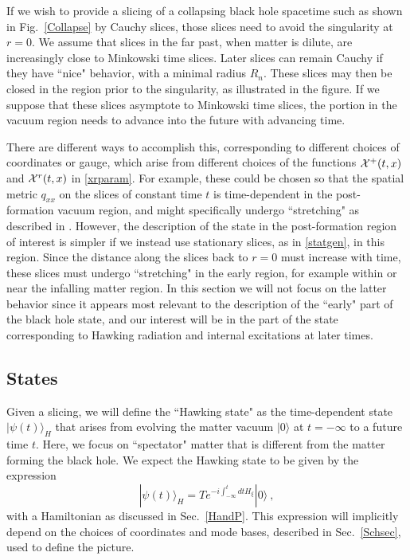 \documentclass[12pt]{article}
\numberwithin{equation}{section}
\newcommand{\beq}{\begin{equation}}
\newcommand{\eeq}{\end{equation}}
\begin{document}
If we wish to provide a slicing of a collapsing black hole spacetime such as shown in Fig.~\ref{Collapse} by Cauchy slices, those slices need to avoid the singularity at $r=0$.  
We assume that slices in the far past, when matter is dilute, are increasingly close to Minkowski time slices.  Later slices can remain Cauchy
 if they have ``nice" behavior, with a minimal radius $R_n$. These slices may then be closed in the region prior to the singularity, as illustrated in the figure.  If we suppose that these slices asymptote to Minkowski time slices, the portion in the vacuum region needs to advance  into the future with advancing time.  




There are different ways to accomplish this, corresponding to different choices of coordinates or gauge, which arise from different choices of the functions ${\cal X}^+(t,x)$ and ${\cal X}^r(t,x)$ in \eqref{xrparam}.  For example, these could be chosen so that the spatial metric $q_{xx}$ on the slices of constant time $t$ is time-dependent in the post-formation vacuum region, and might specifically undergo ``stretching" as described in \cite{Mathinforev}.  However, the description of the state in the post-formation region of interest is simpler if we instead use stationary slices, as in \eqref{statgen}, in this region.  Since the distance along the slices back to $r=0$ must increase with time, these slices must undergo ``stretching" in the early region, for example within or near the infalling matter region.  In this section we will not focus on the latter behavior since it appears most relevant to the description of the ``early" part of the black hole state, and our interest will be in the part of the state corresponding to Hawking radiation and internal excitations at later times.

\subsection{States}

Given a slicing, we will define the ``Hawking state" as the time-dependent state $|\psi(t)\rangle_H$ that arises from evolving the matter vacuum $|0\rangle$ at $t=-\infty$ to a future time $t$.  Here, we focus on ``spectator" matter that is different from the matter forming the black hole.  We expect the Hawking state to be given by the expression
\beq\label{Hevol}
|\psi(t)\rangle_H = T e^{ -i \int_{-\infty}^tdt H_\xi}|0\rangle\ ,
\eeq
with a Hamiltonian as discussed in Sec.~\ref{HandP}.  This expression will implicitly depend on the choices of coordinates and mode bases, described in Sec.~\ref{Schsec}, used to define the picture.
\end{document}
